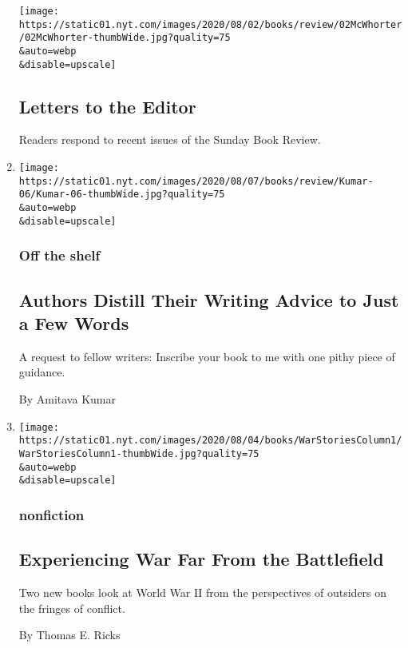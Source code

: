 \begin{enumerate}
  \texttt{[image: https://static01.nyt.com/images/2020/08/02/books/review/02McWhorter/02McWhorter-thumbWide.jpg?quality=75\\\&auto=webp\\\&disable=upscale]}

  \hypertarget{letters-to-the-editor}{%
  \subsection{Letters to the Editor}\label{letters-to-the-editor}}

  Readers respond to recent issues of the Sunday Book Review.
\item
  \href{/2020/08/07/books/zadie-smith-lydia-davis-yiyun-li-mark-doty-jamaica-kincaid-colum-mccann-jenny-offill-tommy-orange.html}{}

  \texttt{[image: https://static01.nyt.com/images/2020/08/07/books/review/Kumar-06/Kumar-06-thumbWide.jpg?quality=75\\\&auto=webp\\\&disable=upscale]}

  \hypertarget{off-the-shelf}{%
  \subsubsection{Off the shelf}\label{off-the-shelf}}

  \hypertarget{authors-distill-their-writing-advice-to-just-a-few-words}{%
  \subsection{Authors Distill Their Writing Advice to Just a Few
  Words}\label{authors-distill-their-writing-advice-to-just-a-few-words}}

  A request to fellow writers: Inscribe your book to me with one pithy
  piece of guidance.

  By Amitava Kumar
\item
  \href{/2020/08/06/books/review/eileen-alexander-love-in-the-blitz-james-nolan-jr-atomic-doctors.html}{}

  \texttt{[image: https://static01.nyt.com/images/2020/08/04/books/WarStoriesColumn1/WarStoriesColumn1-thumbWide.jpg?quality=75\\\&auto=webp\\\&disable=upscale]}

  \hypertarget{nonfiction-1}{%
  \subsubsection{nonfiction}\label{nonfiction-1}}

  \hypertarget{experiencing-war-far-from-the-battlefield}{%
  \subsection{Experiencing War Far From the
  Battlefield}\label{experiencing-war-far-from-the-battlefield}}

  Two new books look at World War II from the perspectives of outsiders
  on the fringes of conflict.

  By Thomas E. Ricks
\end{enumerate}

